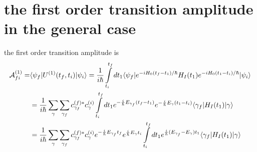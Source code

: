 \section{the first order transition amplitude in the general case}
the first order transition amplitude is
\begin{align}
  {\cal A}_{fi}^{(1)} = & \langle \psi_f | U^{(1)}(t_f,t_i) | \psi_i \rangle = \frac{1}{i\hbar} \int\limits_{t_i}^{t_f}dt_1 \langle \psi_f | e^{-iH_0(t_f-t_1)/\hbar} H_I(t_1) e^{-iH_0(t_1-t_i)/\hbar} | \psi_i \rangle\nonumber                                                                                  \\
  & = \frac{1}{i\hbar} \sum\limits_{\gamma}\sum\limits_{\gamma_f}c_{\gamma_f}^{(f)*} c_{\gamma}^{(i)}\int\limits_{t_i}^{t_f}dt_1e^{-\frac{i}{\hbar}E_{\gamma_f} (t_f-t_1)}e^{-\frac{i}{\hbar}E_{\gamma}(t_1-t_i)}\langle \gamma_f |H_I(t_1)| \gamma\rangle\nonumber                          \\
  & =\frac{1}{i\hbar} \sum\limits_{\gamma}\sum\limits_{\gamma_f}c_{\gamma_f}^{(f)*} c_{\gamma}^{(i)}e^{-\frac{i}{\hbar}E_{\gamma_f} t_f}e^{\frac{i}{\hbar}E_{\gamma} t_i}\int\limits_{t_i}^{t_f}dt_1e^{\frac{i}{\hbar}(E_{\gamma_f}-E_{\gamma})t_1}\langle \gamma_f |H_I(t_1)| \gamma\rangle
\end{align}

